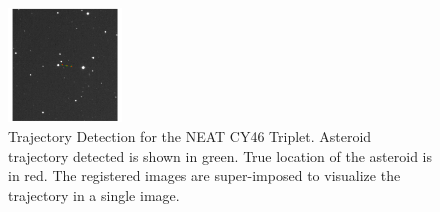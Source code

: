 \begin{figure}[t]
\vspace{-0.4cm}
\begin{center}
\includegraphics[width=0.27\textwidth]{Figures/NEATLines_MaxImage_31019_30000.pdf}
\end{center}
\vspace{-0.7cm}
\caption{Trajectory Detection for the NEAT CY46 Triplet. Asteroid trajectory detected is shown in green. True location of the asteroid is in red. The registered images are super-imposed to visualize the trajectory in a single image. }
\label{fig:IPP_NEAT_Trajectory}
\vspace{-0.3cm}
\end{figure}

%

